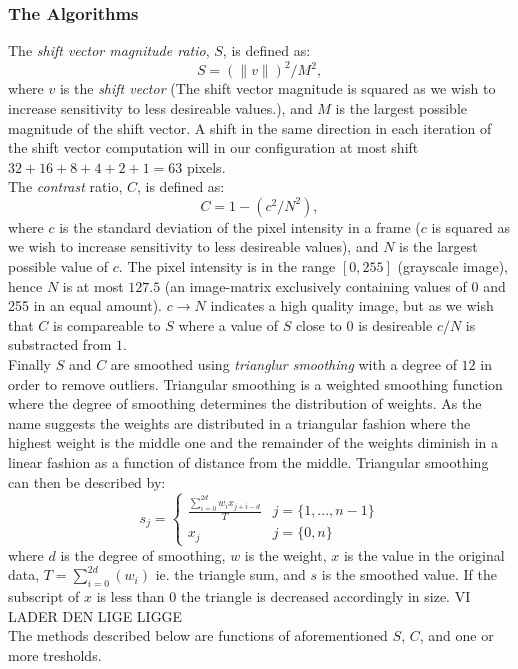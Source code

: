 \subsubsection{The Algorithms}
%
%
%
The \textit{shift vector magnitude ratio}, $S$, is defined as: %
\[
S = (\|v\|)^2 / M^2, 
\]
where $v$ is the \textit{shift vector} (The shift vector magnitude is squared as we wish to increase sensitivity to less desireable values.), and $M$ is the largest possible magnitude of the shift vector. A shift in the same direction in each iteration of the shift vector computation will in our configuration at most shift $32+16+8+4+2+1=63$ pixels.\\
%
The \textit{contrast} ratio, $C$, is defined as:
\[
C = 1 - (c^2 / N^2),
\]
where $c$ is the standard deviation of the pixel intensity in a frame ($c$ is squared as we wish to increase sensitivity to less desireable values), and $N$ is the largest possible value of $c$. The pixel intensity is in the range $[0,255]$ (grayscale image), hence $N$ is at most $127.5$ (an image-matrix exclusively containing values of 0 and 255 in an equal amount). $c \to N$ indicates a high quality image, but as we wish that $C$ is compareable to $S$ where a value of $S$ close to 0 is desireable $c/N$ is substracted from $1$.\\
%
Finally $S$ and $C$ are smoothed using \textit{trianglur smoothing} with a degree of $12$ in order to remove outliers. Triangular smoothing is a weighted smoothing function where the degree of smoothing determines the distribution of weights. As the name suggests the weights are distributed in a triangular fashion where the highest weight is the middle one and the remainder of the weights diminish in a linear fashion as a function of distance from the middle. Triangular smoothing can then be described by:
%
\[
s_{j} = 
\begin{cases}
\frac{\sum_{i=0}^{2d} w_{i}x_{j+i-d}}{T} & j=\{1,...,n-1\}\\
x_{j} & j=\{0,n\}
\end{cases}
\]
%
where $d$ is the degree of smoothing, $w$ is the weight, $x$ is the value in the original data, $T = \sum_{i=0}^{2d}(w_{i})$ ie. the triangle sum, and $s$ is the smoothed value. If the subscript of $x$ is less than 0 the triangle is decreased accordingly in size. VI LADER DEN LIGE LIGGE\\
%
The methods described below are functions of aforementioned $S$, $C$, and one or more tresholds.
%

